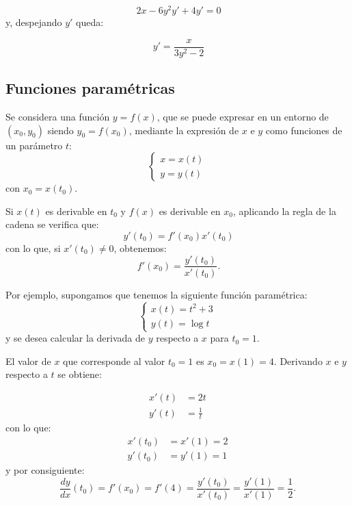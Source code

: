 \[
\ 2x-6y^{2}y'+4y'=0
\]
y, despejando $y'$ queda:

\[
\ y'=\frac{x}{3y^{2}-2}
\]

\subsection*{Funciones paramétricas}

Se considera una función $y=f(x)$, que se puede expresar en un
entorno de $(x_{0},y_{0})$ siendo $y_{0}=f(x_{0})$, mediante la
expresión de $x$ e $y$ como funciones de un parámetro $t$:
\[
\left\{
\begin{array}{l}
x=x(t)\\
y=y(t)
\end{array}
\right.
\]
con $x_{0}=x(t_{0})$.

Si $x(t)$ es derivable en $t_{0}$ y $f(x)$ es derivable en $x_{0}$,
aplicando la regla de la cadena se verifica que:
\[
\ y'(t_{0})=f'(x_{0})x'(t_{0})
\]
con lo que, si $x'(t_{0})\neq0$, obtenemos:
\[
\ f'(x_{0})=\frac{y'(t_{0})}{x'(t_{0})}.
\]

Por ejemplo, supongamos que tenemos la siguiente función
paramétrica:
\[
\left\{
\begin{array}{l}
x(t)=t^{2}+3\\
y(t)=\log t
\end{array}
\right.
\]
y se desea calcular la derivada de $y$ respecto a $x$ para $t_{0}=1$.

El valor de $x$ que corresponde al valor $t_{0}=1$ es
$x_{0}=x(1)=4$. Derivando $x$ e $y$ respecto a $t$ se obtiene:

\begin{align*}
x'(t) &=2t\\
y'(t) &=\frac{1}{t}
\end{align*}
con lo que:
\begin{align*}
x'(t_{0})&=x'(1)=2\\
y'(t_{0})&=y'(1)=1
\end{align*}
y por consiguiente:
\[
\frac{dy}{dx}(t_0)=f'(x_{0})=f'(4)=\frac{y'(t_{0})}{x'(t_{0})}=\frac{y'(1)}{x'(1)}=\frac{1}{2}.
\]

\newpage

